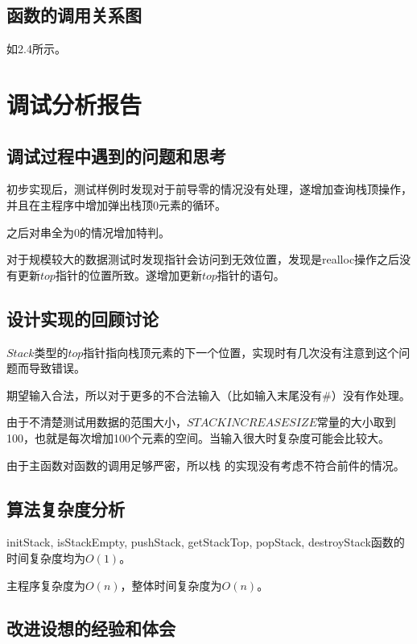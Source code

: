 \documentclass{article}
\begin{document}
\subsection{函数的调用关系图}

如2.4所示。

\section{调试分析报告}

\subsection{调试过程中遇到的问题和思考}

初步实现后，测试样例时发现对于前导零的情况没有处理，遂增加查询栈顶操作，并且在主程序中增加弹出栈顶0元素的循环。

之后对串全为0的情况增加特判。

对于规模较大的数据测试时发现指针会访问到无效位置，发现是realloc操作之后没有更新$top$指针的位置所致。遂增加更新$top$指针的语句。

\subsection{设计实现的回顾讨论}

$Stack$类型的$top$指针指向栈顶元素的下一个位置，实现时有几次没有注意到这个问题而导致错误。

期望输入合法，所以对于更多的不合法输入（比如输入末尾没有\#）没有作处理。

由于不清楚测试用数据的范围大小，$STACKINCREASESIZE$常量的大小取到100，也就是每次增加100个元素的空间。当输入很大时复杂度可能会比较大。

由于主函数对函数的调用足够严密，所以栈 的实现没有考虑不符合前件的情况。

\subsection{算法复杂度分析}

initStack, isStackEmpty, pushStack, getStackTop, popStack, destroyStack函数的时间复杂度均为$O(1)$。

主程序复杂度为$O(n)$，整体时间复杂度为$O(n)$。

\subsection{改进设想的经验和体会}
\end{document}
